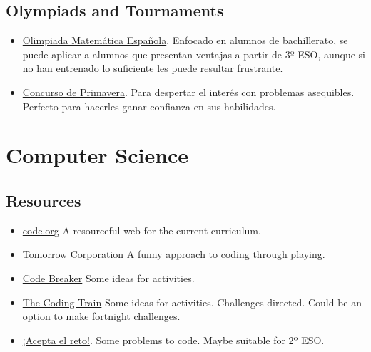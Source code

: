 \subsection*{Olympiads and Tournaments}

\begin{itemize}
  \item \href{https://www.ucm.es/sociedadpuigadam/olimpiada-matematica-fase-local-comunidad-de-madrid}{Olimpiada Matemática Española}. Enfocado en alumnos de bachillerato, se puede aplicar a alumnos que presentan ventajas a partir de 3º ESO, aunque si no han entrenado lo suficiente les puede resultar frustrante.
  \item \href{https://www.concursoprimavera.es/#concurso}{Concurso de Primavera}. Para despertar el interés con problemas asequibles. Perfecto para hacerles ganar confianza en sus habilidades.
\end{itemize}

\section*{Computer Science}

\subsection*{Resources}

\begin{itemize}
  \item \href{https://code.org/}{code.org} A resourceful web for the current curriculum.
  \item \href{https://tomorrowcorporation.com/}{Tomorrow Corporation} A funny approach to coding through playing.
  \item \href{https://codebreaker.teachable.com/}{Code Breaker} Some ideas for activities.
  \item \href{https://thecodingtrain.com/}{The Coding Train} Some ideas for activities. Challenges directed. Could be an option to make fortnight challenges.
  \item \href{https://www.aceptaelreto.com/}{¡Acepta el reto!}. Some problems to code. Maybe suitable for 2º ESO.
\end{itemize}
